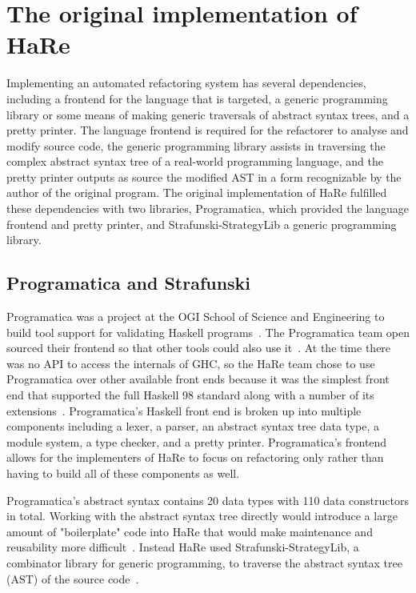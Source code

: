 \section{The original implementation of HaRe}
\label{hareOrig}

Implementing an automated refactoring system has several dependencies, including a frontend for the language that is targeted, a generic programming library or some means of making generic traversals of abstract syntax trees, and a pretty printer. The language frontend is required for the refactorer to analyse and modify source code, the generic programming library assists in traversing the complex abstract syntax tree of a real-world programming language, and the pretty printer outputs as source the modified AST in a form recognizable by the author of the original program. The original implementation of HaRe fulfilled these dependencies with two libraries, Programatica, which provided the language frontend and pretty printer, and Strafunski-StrategyLib a generic programming library. 

\subsection{Programatica and Strafunski}\label{prog&Strafunski}

Programatica was a project at the OGI School of Science and Engineering to build tool support for validating Haskell programs~\citep{programaticaTools}. The Programatica team open sourced their frontend so that other tools could also use it~\citep{refacWebsite}. At the time there was no API to access the internals of GHC, so the HaRe team chose to use Programatica over other available front ends because it was the simplest front end that supported the full Haskell 98 standard along with a number of its extensions~\citep{huiqingThesis}. Programatica's Haskell front end is broken up into multiple components including a lexer, a parser, an abstract syntax tree data type, a module system, a type checker, and a pretty printer. Programatica's frontend allows for the implementers of HaRe to focus on refactoring only rather than having to build all of these components as well.

Programatica's abstract syntax contains 20 data types with 110 data constructors in total. Working with the abstract syntax tree directly would introduce a large amount of "boilerplate" code into HaRe that would make maintenance and reusability more difficult~\citep{huiqingThesis}. Instead HaRe used Strafunski-StrategyLib, a combinator library for generic programming, to traverse the abstract syntax tree (AST) of the source code~\citep{strafunski}. 

